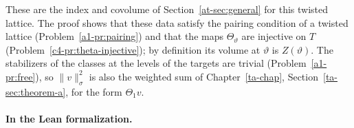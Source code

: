 \documentclass[reqno]{amsart}
\newcounter{chap}
\theoremstyle{plain}
\theoremstyle{definition}
\begin{document}
These are the index and covolume of Section~\ref{at-sec:general} for this twisted lattice.  The proof shows that these data satisfy the pairing condition of a twisted lattice (Problem~\ref{a1-pr:pairing}) and that the maps \(\Theta_\vartheta\) are injective on \(T\) (Problem~\ref{c4-pr:theta-injective}); by definition its volume at \(\vartheta\) is \(Z(\vartheta)\).  The stabilizers of the classes at the levels of the targets are trivial (Problem~\ref{a1-pr:free}), so \(\lVert v \rVert_\sigma^2\) is also the weighted sum of Chapter~\ref{ta-chap}, Section~\ref{ta-sec:theorem-a}, for the form \(\Theta_1 v\).

\paragraph{In the Lean formalization.}
\begin{sloppypar}

\end{sloppypar}
\end{document}
